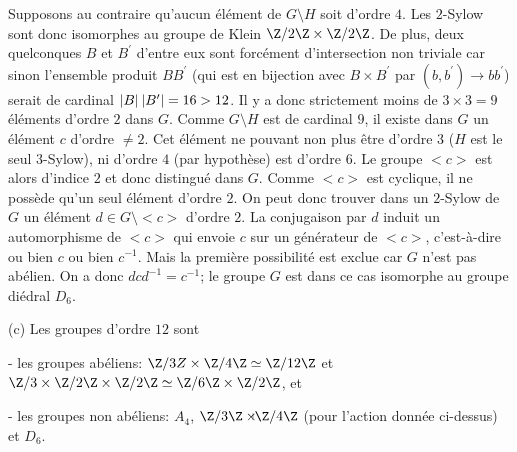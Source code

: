 {{\hskip 5mm Supposons au contraire qu'aucun \'el\'ement de $G\setminus H$ soit
d'ordre $4$. Les $2$-Sylow sont donc isomorphes au groupe de Klein $\Z/2\Z
\times \Z/2\Z$. De plus, deux quelconques $B$ et $B^\prime$ d'entre eux sont
forc\'ement d'intersection non triviale car sinon l'ensemble produit $B B^\prime$
(qui est en bijection avec $B\times B^\prime$ par $(b,b^\prime)\rightarrow
bb^\prime$) serait de cardinal $|B|\hskip 2pt |B^\prime| = 16>12$. Il y a donc
strictement moins de $3\times 3 =9$ \'el\'ements d'ordre $2$ dans $G$. Comme
$G\setminus H$ est de cardinal $9$, il existe dans $G$ un \'el\'ement $c$ 
d'ordre $\not=2$. Cet \'el\'ement ne pouvant non plus \^etre  
d'ordre $3$ ($H$ est le seul $3$-Sylow), ni d'ordre $4$ (par hypoth\`ese) est
d'ordre $6$. Le groupe $<c>$ est alors d'indice $2$ et donc distingu\'e dans $G$.
Comme $<c>$ est cyclique, il ne poss\`ede qu'un seul \'el\'ement d'ordre $2$. On
peut donc trouver dans un $2$-Sylow de $G$ un \'el\'ement $d\in G\setminus <c>$
d'ordre $2$. La conjugaison par $d$ induit un automorphisme de $<c>$ qui envoie $c$
sur un g\'en\'erateur de $<c>$, c'est-\`a-dire ou bien $c$ ou bien $c^{-1}$. Mais la
premi\`ere possibilit\'e est exclue car $G$ n'est pas ab\'elien. On a donc
$dcd^{-1}=c^{-1}$; le groupe $G$ est dans ce cas isomorphe au groupe di\'edral
$D_6$.
\smallskip

(c) Les groupes d'ordre $12$ sont 

- les groupes ab\'eliens: $\Z/3Z \times \Z/4\Z \simeq \Z/12\Z$ et $\Z/3 \times
\Z/2\Z \times \Z/2\Z \simeq \Z/6\Z \times \Z/2\Z$, et

- les groupes non ab\'eliens: $A_4$, $\Z/3\Z \times \hskip -6pt {\raise
1.4pt\hbox{${\scriptscriptstyle |}$}} \Z/4\Z$ (pour l'action donn\'ee ci-dessus)
et $D_6$.
}
}
